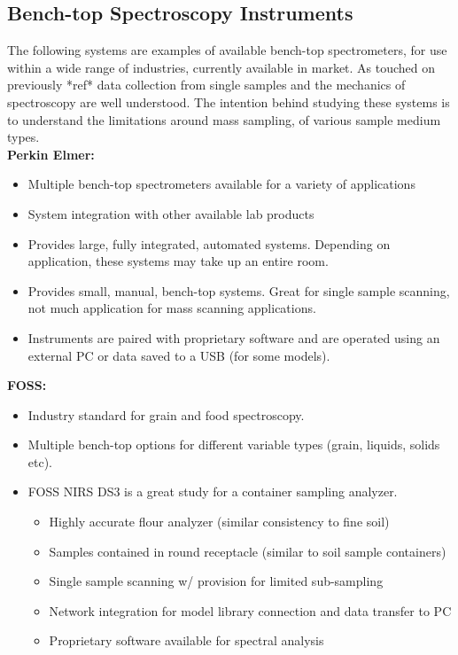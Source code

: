 \documentclass{UoNMCHA}
\numberwithin{equation}{section}
\begin{document}
\subsection{Bench-top Spectroscopy Instruments}
The following systems are examples of available bench-top spectrometers, for use within a wide range of industries, currently available in market. As touched on previously *ref* data collection from single samples and the mechanics of spectroscopy are well understood. The intention behind studying these systems is to understand the limitations around mass sampling, of various sample medium types. \\
\textbf{Perkin Elmer:}\\
\begin{itemize}
	\item Multiple bench-top spectrometers available for a variety of applications
	\item System integration with other available lab products
	\item Provides large, fully integrated, automated systems. Depending on application, these systems may take up an entire room.
	\item Provides small, manual, bench-top systems. Great for single sample scanning, not much application for mass scanning applications. 
	\item Instruments are paired with proprietary software and are operated using an external PC or data saved to a USB (for some models).
\end{itemize}
\textbf{FOSS:}\\
\begin{itemize}
	\item Industry standard for grain and food spectroscopy.
	\item Multiple bench-top options for different variable types (grain, liquids, solids etc).
	\item FOSS NIRS DS3 is a great study for a container sampling analyzer.
	\begin{itemize}
		\item Highly accurate flour analyzer (similar consistency to fine soil)
		\item Samples contained in round receptacle (similar to soil sample containers)
		\item Single sample scanning w/ provision for limited sub-sampling
		\item Network integration for model library connection and data transfer to PC
		\item Proprietary software available for spectral analysis
	\end{itemize}
\end{itemize}
\end{document}
